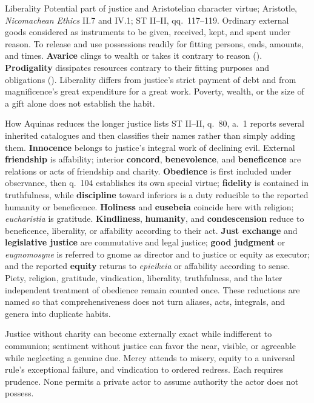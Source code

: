 \virtuedossier
  {Liberality}
  {Potential part of justice and Aristotelian character virtue; Aristotle, \emph{Nicomachean Ethics} II.7 and IV.1; ST II--II, qq.~117--119.}
  {Ordinary external goods considered as instruments to be given, received, kept, and spent under reason.}
  {To release and use possessions readily for fitting persons, ends, amounts, and times.}
  {\textbf{Avarice} clings to wealth or takes it contrary to reason ().}
  {\textbf{Prodigality} dissipates resources contrary to their fitting purposes and obligations ().}
  {Liberality differs from justice's strict payment of debt and from magnificence's great expenditure for a great work. Poverty, wealth, or the size of a gift alone does not establish the habit.}

\begin{studybox}{How Aquinas reduces the longer justice lists}
ST II--II, q.~80, a.~1 reports several inherited catalogues and then classifies their names rather than simply adding them. \textbf{Innocence} belongs to justice's integral work of declining evil. External \textbf{friendship} is affability; interior \textbf{concord}, \textbf{benevolence}, and \textbf{beneficence} are relations or acts of friendship and charity. \textbf{Obedience} is first included under observance, then q.~104 establishes its own special virtue; \textbf{fidelity} is contained in truthfulness, while \textbf{discipline} toward inferiors is a duty reducible to the reported humanity or beneficence. \textbf{Holiness} and \textbf{eusebeia} coincide here with religion; \emph{eucharistia} is gratitude. \textbf{Kindliness}, \textbf{humanity}, and \textbf{condescension} reduce to beneficence, liberality, or affability according to their act. \textbf{Just exchange} and \textbf{legislative justice} are commutative and legal justice; \textbf{good judgment} or \emph{eugnomosyne} is referred to gnome as director and to justice or equity as executor; and the reported \textbf{equity} returns to \emph{epieikeia} or affability according to sense. Piety, religion, gratitude, vindication, liberality, truthfulness, and the later independent treatment of obedience remain counted once. These reductions are named so that comprehensiveness does not turn aliases, acts, integrals, and genera into duplicate habits.
\end{studybox}


Justice without charity can become externally exact while indifferent to communion; sentiment without justice can favor the near, visible, or agreeable while neglecting a genuine due. Mercy attends to misery, equity to a universal rule's exceptional failure, and vindication to ordered redress. Each requires prudence. None permits a private actor to assume authority the actor does not possess.
